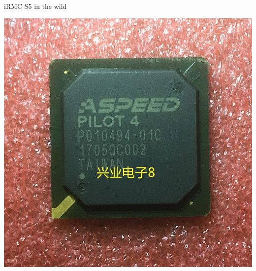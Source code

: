 \documentclass{beamer}
\begin{document}
  \begin{frame}{iRMC S5 in the wild}
	  \begin{center}
		  \includegraphics[scale=0.3]{aspeed-pilot4.jpg}
	  \end{center}
  \end{frame}
\end{document}
